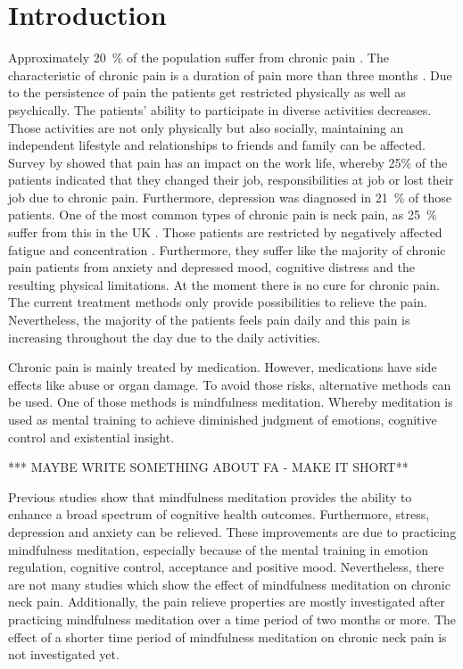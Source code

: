 \section{Introduction}
Approximately 20~\% of the population suffer from chronic pain \cite{Macfarlanea2016}. The characteristic of chronic pain is a duration of pain more than three months \cite{Mello2016}. Due to the persistence of pain the patients get restricted physically as well as psychically. The patients’ ability to participate in diverse activities decreases. Those activities are not only physically but also socially, maintaining an independent lifestyle and relationships to friends and family can be affected. Survey by \cite{Breivik2006} showed that pain has an impact on the work life, whereby 25\% of the patients indicated that they changed their job, responsibilities at job or lost their job due to chronic pain. Furthermore, depression was diagnosed in 21~\% of those patients. \cite{Breivik2006} One of the most common types of chronic pain is neck pain, as 25~\% suffer from this in the UK \cite{Macfarlanea2016}. Those patients are restricted by negatively affected fatigue and concentration \cite{vanRanderaat2016}. Furthermore, they suffer like the majority of chronic pain patients from anxiety and depressed mood, cognitive distress and the resulting physical limitations. \cite{Gross2013} At the moment there is no cure for chronic pain. The current treatment methods only provide possibilities to relieve the pain. \cite{Pope2017,marcus2009} Nevertheless, the majority of the patients feels pain daily and this pain is increasing throughout the day due to the daily activities. \cite{Breivik2006} 


Chronic pain is mainly treated by medication. However, medications have side effects like abuse or organ damage. To avoid those risks, alternative methods can be used. One of those methods is mindfulness meditation. Whereby meditation is used as mental training to achieve diminished judgment of emotions, cognitive control and existential insight. \cite{marcus2009} 

*** MAYBE WRITE SOMETHING ABOUT FA - MAKE IT SHORT**


Previous studies show that mindfulness meditation provides the ability to enhance a broad spectrum of cognitive health outcomes. Furthermore, stress, depression and anxiety can be relieved. These improvements are due to practicing mindfulness meditation, especially because of the mental training in emotion regulation, cognitive control, acceptance and positive mood. \cite{marcus2009,Zeidan2012}Nevertheless, there are not many studies which show the effect of mindfulness meditation on chronic neck pain. \cite{Macfarlanea2016} Additionally, the pain relieve properties are mostly investigated after practicing mindfulness meditation over a time period of two months or more. The effect of a shorter time period of mindfulness meditation on chronic neck pain is not investigated yet. 



